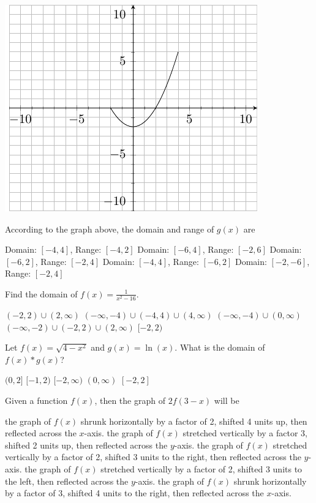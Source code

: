 \documentclass[11pt]{article}
\begin{document}
\begin{questions}
\begin{multiplechoice}{5}
\begin{minipage}{\linewidth}%
\centering
\makebox[\linewidth]{}
\includegraphics{exam1graph2.pdf}
\label{graph2exam1}%
\end{minipage}
According to the graph above, the domain and range of $g(x)$ are
\begin{answers}{2}
\ans Domain: $[-4,4]$, Range: $[-4,2]$
\ans Domain: $[-6,4]$, Range: $[-2,6]$
\ans Domain: $[-6,2]$, Range: $[-2,4]$
\ans Domain: $[-4,4]$, Range: $[-6,2]$
\ans Domain: $[-2,-6]$, Range: $[-2,4]$
\end{answers}

\question Find the domain of $f(x) = \frac{1}{x^2 - 16}$.
\begin{answers}{2}
\ans $(-2,2) \cup (2, \infty)$
\ans $(-\infty, -4) \cup (-4,4) \cup (4, \infty) $
\ans  $(-\infty, -4) \cup (0, \infty)$
\ans  $(-\infty, -2) \cup (-2,2) \cup (2, \infty)$
\ans $[-2,2)$
\end{answers}


\question Let $f(x) = \sqrt{4-x^2}$ and $g(x)=\ln(x)$.  What is the domain of $f(x)*g(x)$?
\begin{answers}{2}
\ans $(0,2]$
\ans $[-1,2)$
\ans $[-2,\infty)$
\ans $(0,\infty)$
\ans $[-2,2]$
\end{answers}

\nextpage

\question Given a function $f(x)$, then the graph of $2f\left(3 - x\right)$ will be
\begin{answers}{2}
\ans the graph of $f(x)$ shrunk horizontally by a factor of 2, shifted 4 units up, then reflected across the $x$-axis.
\ans the graph of $f(x)$ stretched vertically by a factor 3, shifted 2 units up, then reflected across the $y$-axis.
\ans the graph of $f(x)$ stretched vertically by a factor of 2, shifted 3 units to the right, then reflected across the $y$-axis.
\ans the graph of $f(x)$ stretched vertically by a factor of 2, shifted 3 units to the left, then reflected across the $y$-axis.
\ans the graph of $f(x)$ shrunk horizontally by a factor of 3, shifted 4 units to the right, then reflected across the $x$-axis.
\end{answers}



\end{multiplechoice}
\end{questions}
\end{document}
